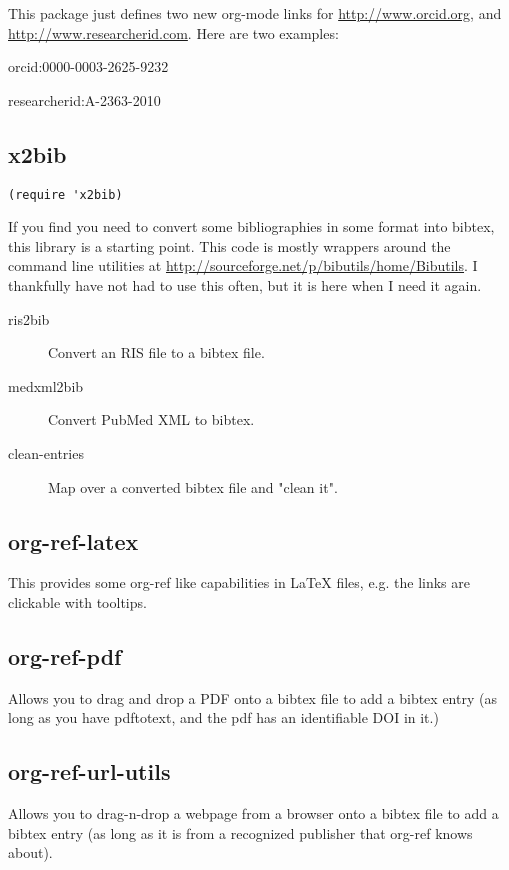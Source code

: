 \documentclass[11pt]{article}
\begin{document}
{This package just defines two new org-mode links for \url{http://www.orcid.org}, and \url{http://www.researcherid.com}. Here are two examples:

orcid:0000-0003-2625-9232

researcherid:A-2363-2010

\subsection{x2bib}
\label{sec-2-9}

\begin{verbatim}
(require 'x2bib)
\end{verbatim}

If you find you need to convert some bibliographies in some format into bibtex, this library is a starting point. This code is mostly wrappers around the command line utilities at \url{http://sourceforge.net/p/bibutils/home/Bibutils}. I thankfully have not had to use this often, but it is here when I need it again.

\begin{description}
\item[{ris2bib}] Convert an RIS file to a bibtex file.
\item[{medxml2bib}] Convert PubMed XML to bibtex.
\item[{clean-entries}] Map over a converted bibtex file and "clean it".
\end{description}

\subsection{org-ref-latex}
\label{sec-2-10}
This provides some org-ref like capabilities in \LaTeX{} files, e.g. the links are clickable with tooltips.

\subsection{org-ref-pdf}
\label{sec-2-11}
Allows you to drag and drop a PDF onto a bibtex file to add a bibtex entry (as long as you have pdftotext, and the pdf has an identifiable DOI in it.)

\subsection{org-ref-url-utils}
\label{sec-2-12}
Allows you to drag-n-drop a webpage from a browser onto a bibtex file to add a bibtex entry (as long as it is from a recognized publisher that org-ref knows about).

}
\end{document}
